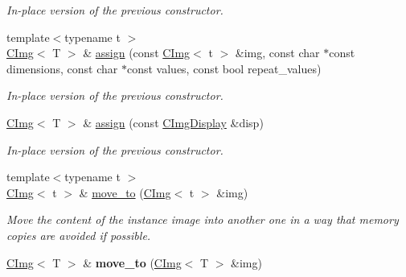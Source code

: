 \begin{DoxyCompactItemize}
\begin{DoxyCompactList}\small\item\em In-\/place version of the previous constructor. \item\end{DoxyCompactList}\item 
\hypertarget{structcimg__library_1_1CImg_a8f579cb225b9af79160e37acd020c2f2}{
{\footnotesize template$<$typename t $>$ }\\\hyperlink{structcimg__library_1_1CImg}{CImg}$<$ T $>$ \& \hyperlink{structcimg__library_1_1CImg_a8f579cb225b9af79160e37acd020c2f2}{assign} (const \hyperlink{structcimg__library_1_1CImg}{CImg}$<$ t $>$ \&img, const char $\ast$const dimensions, const char $\ast$const values, const bool repeat\_\-values)}
\label{structcimg__library_1_1CImg_a8f579cb225b9af79160e37acd020c2f2}

\begin{DoxyCompactList}\small\item\em In-\/place version of the previous constructor. \item\end{DoxyCompactList}\item 
\hypertarget{structcimg__library_1_1CImg_a48123f96bfb3eff6ba15dc4b40a8f81a}{
\hyperlink{structcimg__library_1_1CImg}{CImg}$<$ T $>$ \& \hyperlink{structcimg__library_1_1CImg_a48123f96bfb3eff6ba15dc4b40a8f81a}{assign} (const \hyperlink{structcimg__library_1_1CImgDisplay}{CImgDisplay} \&disp)}
\label{structcimg__library_1_1CImg_a48123f96bfb3eff6ba15dc4b40a8f81a}

\begin{DoxyCompactList}\small\item\em In-\/place version of the previous constructor. \item\end{DoxyCompactList}\item 
{\footnotesize template$<$typename t $>$ }\\\hyperlink{structcimg__library_1_1CImg}{CImg}$<$ t $>$ \& \hyperlink{structcimg__library_1_1CImg_ac0244392599a9df6c9eaa8768e0b436c}{move\_\-to} (\hyperlink{structcimg__library_1_1CImg}{CImg}$<$ t $>$ \&img)
\begin{DoxyCompactList}\small\item\em Move the content of the instance image into another one in a way that memory copies are avoided if possible. \item\end{DoxyCompactList}\item 
\hypertarget{structcimg__library_1_1CImg_a3784ec2ae962ee17d02d6361839c9c92}{
\hyperlink{structcimg__library_1_1CImg}{CImg}$<$ T $>$ \& {\bfseries move\_\-to} (\hyperlink{structcimg__library_1_1CImg}{CImg}$<$ T $>$ \&img)}
\label{structcimg__library_1_1CImg_a3784ec2ae962ee17d02d6361839c9c92}


\end{DoxyCompactItemize}
